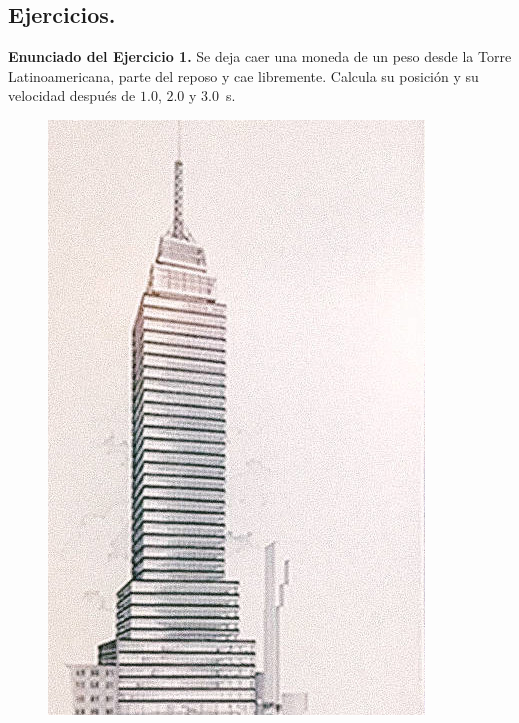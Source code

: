 \documentclass[14pt]{extarticle}
\begin{document}
\subsection{Ejercicios.}

\noindent
\textbf{Enunciado del Ejercicio 1. } Se deja caer una moneda de un peso desde la Torre Latinoamericana, parte del reposo y cae libremente. Calcula su posición y su velocidad después de $1.0$, $2.0$ y \SI{3.0}{\second}.
\begin{figure}[H]
\centering
\includegraphics[scale=1.2]{Imagenes/Torre_Latino.jpg}
\end{figure}
\end{document}
